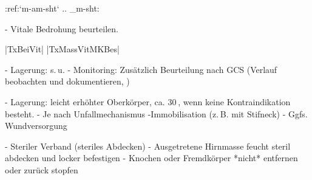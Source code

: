 :ref:`m-am-sht`
.. _m-sht:


\begin{itemize}
  -   Vitale Bedrohung beurteilen. \par |TxBeiVit|
  |TxMassVitMKBes|
  \begin{itemize}
    -   Lagerung: s. u.
    -   Monitoring: Zusätzlich Beurteilung nach GCS (Verlauf beobachten und
    dokumentieren, )
  \end{itemize}
  -   Lagerung: leicht erhöhter Oberkörper, ca.
  30 \textdegree{}, wenn keine Kontraindikation
  besteht.
  -   Je nach Unfallmechanismus -Immobilisation (z. B. mit Stifneck\texttrademark)
  -   Ggfs. Wundversorgung
  \begin{itemize}
    -   Steriler Verband (steriles Abdecken)
    -   Ausgetretene Hirnmasse feucht steril abdecken
        und locker befestigen
    -   Knochen oder Fremdkörper *nicht* entfernen oder zurück stopfen
  \end{itemize}
\end{itemize}